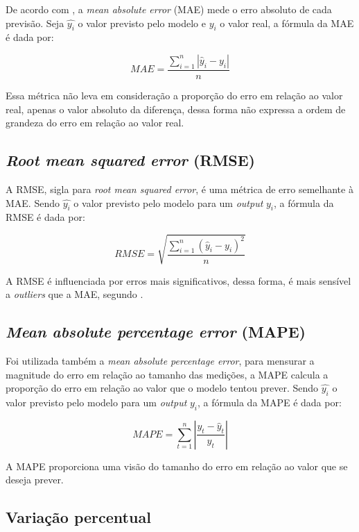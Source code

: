 De acordo com \citet{forecast-evaluation-ds}, a
\textit{mean absolute error} (MAE)
mede o erro absoluto de cada previsão. Seja $\hat{y_i}$ o valor previsto pelo 
modelo e $y_i$ o valor real, a fórmula da MAE é dada por:

\begin{equation}
    MAE = \frac{\sum_{i=1}^n |\hat{y}_i - y_i|}{n}
\end{equation}

Essa métrica não leva em consideração a proporção do erro em relação ao valor
real, apenas o valor absoluto da diferença, dessa forma não expressa a ordem de
grandeza do erro em relação ao valor real.

\subsection{\textit{Root mean squared error} (RMSE)}

A RMSE, sigla para \textit{root mean squared  error}, é uma métrica de erro
semelhante à MAE. Sendo $\hat{y_i}$ o valor previsto pelo 
modelo para um \textit{output} $y_i$, a fórmula da RMSE é dada por: 

\begin{equation}
    RMSE = \sqrt{\frac{\sum_{i=1}^n (\hat{y}_i - y_i)^2}{n}}
\end{equation}

A RMSE é influenciada por erros mais significativos, dessa forma, é mais 
sensível a \textit{outliers} que a MAE, segundo \citet{forecast-evaluation-ds}. 

\subsection{\textit{Mean absolute percentage error} (MAPE)}

Foi utilizada também a \textit{mean absolute
percentage error}, para mensurar a magnitude do erro em 
relação ao tamanho das medições, a MAPE calcula a proporção 
do erro em relação ao valor que o modelo tentou prever. Sendo $\hat{y_i}$ 
o valor previsto pelo 
modelo para um \textit{output} $y_i$, a fórmula da MAPE é dada por: 

\begin{equation}
    MAPE=\sum_{t=1}^n\left|\frac{y_t-\hat{y}_t}{y_t}\right|
\end{equation}

A MAPE proporciona uma visão do tamanho do erro em relação ao valor que se 
deseja prever.

\subsection{Variação percentual}

